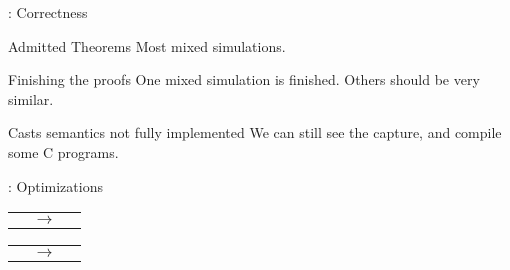 \begin{frame}{\secname: Correctness}

  \begin{alertblock}{Admitted Theorems}
    Most mixed simulations.
  \end{alertblock}
  \vfill
  \begin{exampleblock}{Finishing the proofs}
    One mixed simulation is finished. Others should be very similar.
  \end{exampleblock}
  \vfill
  \begin{alertblock}{Casts semantics not fully implemented}
    We can still see the capture, and compile some C programs.
  \end{alertblock}
  
\end{frame}

\begin{frame}{\secname: Optimizations}
  \begin{tabular}{l c r}
     &
    $\longrightarrow$ &
    
  \end{tabular}
  \vfill
  \begin{tabular}{l c r}
     &
    $\longrightarrow$ & 
    
  \end{tabular}

\end{frame}
